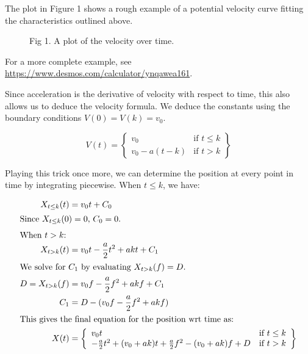 \documentclass[a4paper,12pt]{article}
\begin{document}
The plot in Figure 1 shows a rough example of a potential
velocity curve fitting the characteristics outlined above.

\begin{figure}[htbp]
\centering
{}
\caption{Fig 1. A plot of the velocity over time.}
\label{fig:1}
\end{figure}

For a more complete example, see
\url{https://www.desmos.com/calculator/ynqawea161}.



Since acceleration is the derivative of velocity with respect to time, this
also allows us to deduce the velocity formula. We deduce the constants
using the boundary conditions $V(0) = V(k) = v_0$.

$$
  V(t) = \left\{
    \begin{array}{ll}
      v_0          & \mbox{if $t \leq k$} \\
      v_0 - a(t-k) & \mbox{if $t > k$}
    \end{array}
  \right\}
$$

Playing this trick once more, we can determine the position at every point in
time by integrating piecewise.  When $t \leq k$, we have:

\begin{align*}
  X_{t \leq k}(t) &= v_0 t + C_0 \\
  \intertext{Since $X_{t \leq k}(0) = 0$, $C_0=0$.}
  \intertext{When $t > k$:}
  X_{t > k}(t) &= v_0 t - \frac{a}{2} t^2 + akt + C_1 \\
  \intertext{We solve for $C_1$ by evaluating $X_{t > k}(f) = D$.}
  D = X_{t > k}(f) &= v_0 f - \frac{a}{2} f^2 + akf + C_1 \\
  C_1          &= D - (v_0 f - \frac{a}{2} f^2 + akf) \\
  \intertext{This gives the final equation for the position wrt time as:}
  X(t) &= \left\{
    \begin{array}{ll}
      v_0 t & \mbox{if $t \leq k$} \\
      - \frac{a}{2} t^2 + (v_0 + ak)t + \frac{a}{2} f^2 - (v_0 + ak) f + D & \mbox{if $t > k$}
    \end{array}
  \right\}
\end{align*}
\end{document}
